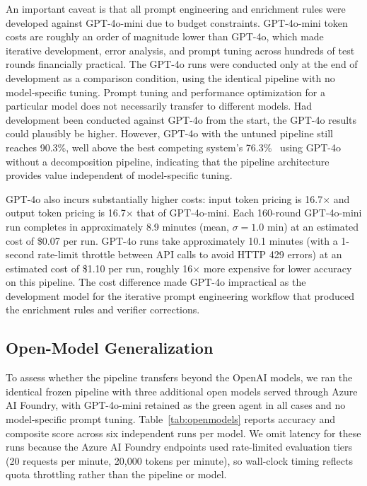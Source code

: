 \documentclass{article}
\begin{document}
An important caveat is that all prompt engineering and enrichment rules
were developed against GPT-4o-mini due to budget constraints. GPT-4o-mini
token costs are roughly an order of magnitude lower than GPT-4o, which
made iterative development, error analysis, and prompt tuning across
hundreds of test rounds financially practical. The GPT-4o runs were
conducted only at the end of development as a comparison condition, using
the identical pipeline with no model-specific tuning. Prompt tuning and
performance optimization for a particular model does not necessarily
transfer to different models. Had development been conducted against
GPT-4o from the start, the GPT-4o results could plausibly be higher.
However, GPT-4o with the untuned pipeline still reaches
90.3\%, well above the best competing system's 76.3\%~\cite{hisandan} using GPT-4o
without a decomposition pipeline, indicating that the pipeline
architecture provides value independent of model-specific tuning.

GPT-4o also incurs substantially higher costs: input token pricing is
16.7$\times$ and output token pricing is 16.7$\times$ that of
GPT-4o-mini. Each 160-round GPT-4o-mini run completes in approximately
8.9 minutes (mean, $\sigma = 1.0$ min) at an estimated cost of
\$0.07 per run. GPT-4o runs take approximately 10.1 minutes (with a
1-second rate-limit throttle between API calls to avoid HTTP 429 errors)
at an estimated cost of \$1.10 per run, roughly 16$\times$ more expensive
for lower accuracy on this pipeline. The cost difference made
GPT-4o impractical as the development model for the iterative prompt
engineering workflow that produced the enrichment rules and verifier
corrections.

\subsection{Open-Model Generalization}

To assess whether the pipeline transfers beyond the OpenAI models, we ran
the identical frozen pipeline with three additional open models served
through Azure AI Foundry, with GPT-4o-mini retained as the green agent in
all cases and no model-specific prompt tuning. Table~\ref{tab:openmodels}
reports accuracy and composite score across six independent runs per
model. We omit latency for these runs because the Azure AI Foundry
endpoints used rate-limited evaluation tiers (20 requests per minute,
20{,}000 tokens per minute), so wall-clock timing reflects quota
throttling rather than the pipeline or model.
\end{document}
